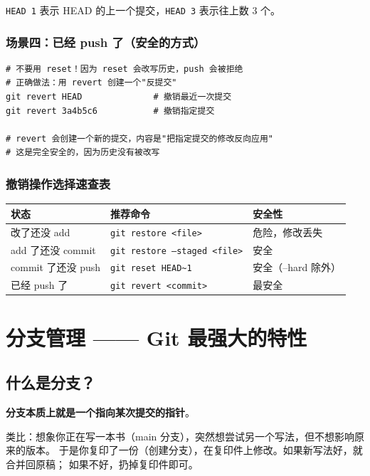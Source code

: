 \documentclass[12pt,a4paper]{article}
\begin{document}
\texttt{HEAD~1} 表示 HEAD 的上一个提交，\texttt{HEAD~3} 表示往上数 3 个。

\subsubsection{场景四：已经 push 了（安全的方式）}

\begin{lstlisting}
# 不要用 reset！因为 reset 会改写历史，push 会被拒绝
# 正确做法：用 revert 创建一个"反提交"
git revert HEAD              # 撤销最近一次提交
git revert 3a4b5c6           # 撤销指定提交

# revert 会创建一个新的提交，内容是"把指定提交的修改反向应用"
# 这是完全安全的，因为历史没有被改写
\end{lstlisting}

\subsubsection{撤销操作选择速查表}

\begin{longtable}{|p{3.5cm}|p{4.5cm}|p{4cm}|}
\hline
\textbf{状态} & \textbf{推荐命令} & \textbf{安全性} \\
\hline
改了还没 add & \texttt{git restore <file>} & 危险，修改丢失 \\
\hline
add 了还没 commit & \texttt{git restore --staged <file>} & 安全 \\
\hline
commit 了还没 push & \texttt{git reset HEAD\textasciitilde1} & 安全（--hard 除外） \\
\hline
已经 push 了 & \texttt{git revert <commit>} & 最安全 \\
\hline
\end{longtable}

\section{分支管理 —— Git 最强大的特性}

\subsection{什么是分支？}

\textbf{分支本质上就是一个指向某次提交的指针}。

类比：想象你正在写一本书（main 分支），突然想尝试另一个写法，但不想影响原来的版本。
于是你复印了一份（创建分支），在复印件上修改。如果新写法好，就合并回原稿；
如果不好，扔掉复印件即可。
\end{document}
